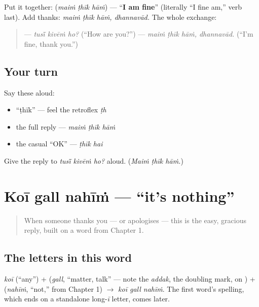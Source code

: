 \begin{grammarlens}[title={Grammar Lens: the reply}]
Put it together: \textbf{  } (\emph{maiṁ ṭhīk hāṁ}) — \textquotedblleft{}\textbf{I am fine}\textquotedblright{} (literally \textquotedblleft{}I fine am,\textquotedblright{} verb last). Add thanks: \emph{maiṁ ṭhīk hāṁ, dhannavād.} The whole exchange:

\begin{quote}
— \emph{tusī̃ kivēṁ ho?} (\textquotedblleft{}How are you?\textquotedblright{}) — \emph{maiṁ ṭhīk hāṁ, dhannavād.} (\textquotedblleft{}I'm fine, thank you.\textquotedblright{})
\end{quote}
\end{grammarlens}

\subsection*{Your turn}
Say these aloud:

\begin{itemize}
\raggedright
  \item \textquotedblleft{}ṭhīk\textquotedblright{} — feel the retroflex \emph{ṭh}
  \item the full reply — \emph{maiṁ ṭhīk hāṁ}
  \item the casual \textquotedblleft{}OK\textquotedblright{} — \emph{ṭhīk hai}
\end{itemize}

\begin{tcolorbox}[breakable,colback=teal!4,colframe=teal!35!black,title={Before you move on}]
Give the reply to \emph{tusī̃ kivēṁ ho?} aloud. (\emph{Maiṁ ṭhīk hāṁ.})
\end{tcolorbox}
\section[\texorpdfstring{\pa{ਕੋਈ} \pa{ਗੱਲ} \pa{ਨਹੀਂ} (koī gall nahīṁ)}{ਕੋਈ ਗੱਲ ਨਹੀਂ (koī gall nahīṁ)}]{Koī gall nahīṁ — \textquotedblleft{}it's nothing\textquotedblright{}}

\label{lesson:PA-C03-koi-gall-nahin}



\begin{quote}
When someone thanks you — or apologises — this is the easy, gracious reply, built on a word from Chapter 1.
\end{quote}

\subsection*{The letters in this word}
\emph{koī} (\textquotedblleft{}any\textquotedblright{}) + \textbf{} (\emph{gall}, \textquotedblleft{}matter, talk\textquotedblright{} — note the \emph{addak}, the doubling mark, on \textbf{}) + \textbf{} (\emph{nahīṁ}, \textquotedblleft{}not,\textquotedblright{} from Chapter 1) $\to$ \emph{koī gall nahīṁ}. The first word's spelling, which ends on a standalone long-\emph{ī} letter, comes later.

